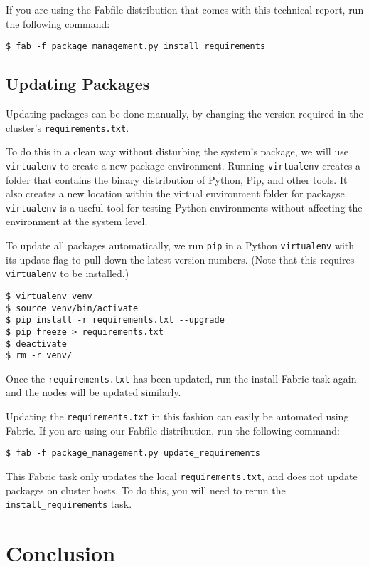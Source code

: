 \documentclass[9pt,twocolumn,twoside]{idsi}
\begin{document}
If you are using the Fabfile distribution that comes with this technical report, run the following command:

\begin{verbatim}
$ fab -f package_management.py install_requirements
\end{verbatim}

\subsection{Updating Packages}
Updating packages can be done manually, by changing the version required in the cluster's \texttt{requirements.txt}.

To do this in a clean way without disturbing the system's package, we will use \texttt{virtualenv} to create a new package environment. Running \texttt{virtualenv} creates a folder that contains the binary distribution of Python, Pip, and other tools. It also creates a new location within the virtual environment folder for packagse. \texttt{virtualenv} is a useful tool for testing Python environments without affecting the environment at the system level.

To update all packages automatically, we run \texttt{pip} in a Python \texttt{virtualenv} with its update flag to pull down the latest version numbers. (Note that this requires \texttt{virtualenv} to be installed.)

\begin{verbatim}
$ virtualenv venv
$ source venv/bin/activate
$ pip install -r requirements.txt --upgrade
$ pip freeze > requirements.txt
$ deactivate
$ rm -r venv/
\end{verbatim}

Once the \texttt{requirements.txt} has been updated, run the install Fabric task again and the nodes will be updated similarly.

Updating the \texttt{requirements.txt} in this fashion can easily be automated using Fabric. If you are using our Fabfile distribution, run the following command:
\begin{verbatim}
$ fab -f package_management.py update_requirements
\end{verbatim}

This Fabric task only updates the local \texttt{requirements.txt}, and does not update packages on cluster hosts. To do this, you will need to rerun the \texttt{install\_requirements} task.

\section{Conclusion}  
\end{document}
